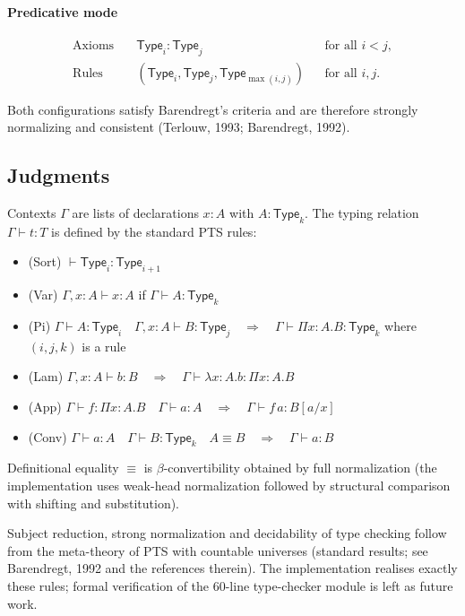 \documentclass{article}
\begin{document}
\paragraph{Predicative mode}
\begin{align*}
\text{Axioms} &\quad \mathsf{Type}_i : \mathsf{Type}_j &&\text{for all } i < j, \\
\text{Rules}  &\quad (\mathsf{Type}_i, \mathsf{Type}_j, \mathsf{Type}_{\max(i,j)}) &&\text{for all } i,j.
\end{align*}

Both configurations satisfy Barendregt's criteria and are therefore strongly normalizing and consistent (Terlouw, 1993; Barendregt, 1992).

\subsection{Judgments}

Contexts $\Gamma$ are lists of declarations $x:A$ with $A:\mathsf{Type}_k$. The typing relation $\Gamma \vdash t : T$ is defined by the standard PTS rules:

\begin{itemize}
\item (Sort) $\vdash \mathsf{Type}_i : \mathsf{Type}_{i+1}$
\item (Var) $\Gamma, x:A \vdash x : A$ if $\Gamma \vdash A : \mathsf{Type}_k$
\item (Pi) $\Gamma \vdash A : \mathsf{Type}_i \quad \Gamma,x:A \vdash B : \mathsf{Type}_j \quad \Rightarrow \quad \Gamma \vdash \Pi x:A.B : \mathsf{Type}_k$ where $(i,j,k)$ is a rule
\item (Lam) $\Gamma,x:A \vdash b : B \quad \Rightarrow \quad \Gamma \vdash \lambda x:A.b : \Pi x:A.B$
\item (App) $\Gamma \vdash f : \Pi x:A.B \quad \Gamma \vdash a : A \quad \Rightarrow \quad \Gamma \vdash f\,a : B[a/x]$
\item (Conv) $\Gamma \vdash a : A \quad \Gamma \vdash B : \mathsf{Type}_k \quad A \equiv B \quad \Rightarrow \quad \Gamma \vdash a : B$
\end{itemize}

Definitional equality $\equiv$ is $\beta$-convertibility obtained by full normalization (the implementation uses weak-head normalization
followed by structural comparison with shifting and substitution).

Subject reduction, strong normalization and decidability of type checking follow from the meta-theory of PTS with countable universes (standard results;
see Barendregt, 1992 and the references therein). The implementation realises exactly these rules; formal verification of the 60-line type-checker module is left as future work.
\end{document}
